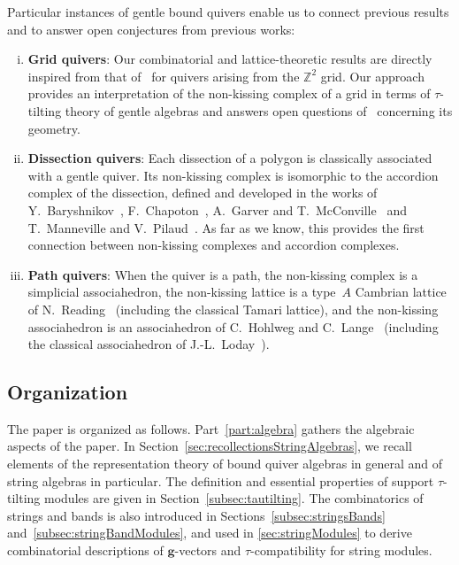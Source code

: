 \documentclass{amsart}
\theoremstyle{definition}
\newcommand{\Z}{\mathbb{Z}} %
\renewcommand{\b}[1]{\mathbf{#1}} %
\begin{document}
\enlargethispage{.4cm}
Particular instances of gentle bound quivers enable us to connect previous results and to answer open conjectures from previous works:
\begin{enumerate}[(i)]
\item \textbf{Grid quivers}: Our combinatorial and lattice-theoretic results are directly inspired from that of~\cite{PetersenPylyavskyySpeyer, SantosStumpWelker, McConville, GarverMcConville-grid} for quivers arising from the $\Z^2$ grid. Our approach provides an interpretation of the non-kissing complex of a grid in terms of $\tau$-tilting theory of gentle algebras and answers open questions of~\cite{GarverMcConville-grid} concerning its geometry.
\item \textbf{Dissection quivers}: Each dissection of a polygon is classically associated with a gentle quiver. Its non-kissing complex is isomorphic to the accordion complex of the dissection, defined and developed in the works of Y.~Baryshnikov~\cite{Baryshnikov}, F.~Chapoton~\cite{Chapoton-quadrangulations}, A.~Garver and T.~McConville~\cite{GarverMcConville} and T.~Manneville and V.~Pilaud~\cite{MannevillePilaud-accordion}. As far as we know, this provides the first connection between non-kissing complexes and accordion complexes.
\item \textbf{Path quivers}: When the quiver is a path, the non-kissing complex is a simplicial associahedron, the non-kissing lattice is a type~$A$ Cambrian lattice of N.~Reading~\cite{Reading-CambrianLattices} (including the classical Tamari lattice), and the non-kissing associahedron is an associahedron of C.~Hohlweg and C.~Lange~\cite{HohlwegLange} (including the classical associahedron of J.-L.~Loday~\cite{Loday}).
\end{enumerate}

\subsection*{Organization}

The paper is organized as follows.
Part~\ref{part:algebra} gathers the algebraic aspects of the paper.
In Section~\ref{sec:recollectionsStringAlgebras}, we recall elements of the representation theory of bound quiver algebras in general and of string algebras in particular.
The definition and essential properties of support \mbox{$\tau$-tilting} modules are given in Section~\ref{subsec:tautilting}.  
The combinatorics of strings and bands is also introduced in Sections~\ref{subsec:stringsBands} and~\ref{subsec:stringBandModules}, and used in \ref{sec:stringModules} to derive combinatorial descriptions of $\b{g}$-vectors and $\tau$-compatibility for string modules.
\end{document}
